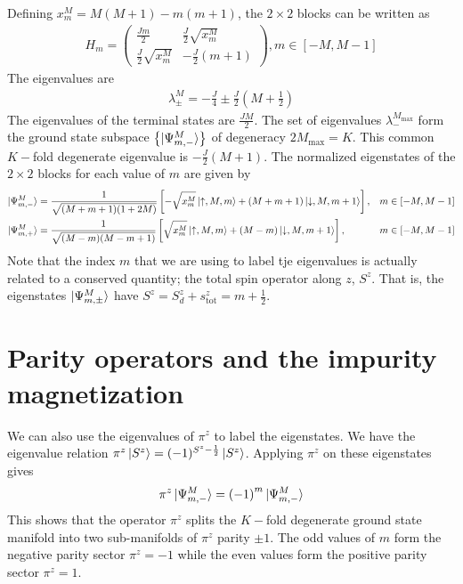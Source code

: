 \documentclass{revtex4-2}
\begin{document}
Defining \(x^M_m = M(M+1) - m(m+1)\), the \(2\times 2\) blocks can be written as
\begin{align}
	H_m = \begin{pmatrix} \frac{Jm}{2} & \frac{J}{2}\sqrt{x^M_m} \\ \frac{J}{2}\sqrt{x^M_m} & -\frac{J}{2}(m+1) \end{pmatrix} , m \in \left[-M, M-1\right] 
\end{align}
The eigenvalues are 
\begin{align}
	\lambda_{\pm}^{M} = - \frac{J}{4} \pm \frac{J}{2}\left(M + \frac{1}{2}\right) 
\end{align}
The eigenvalues of the terminal states are \(\frac{JM}{2}\). The set of eigenvalues \(\lambda^{M_\text{max}}_-\) form the ground state subspace \(\left\{ \ket{\Psi^M_{m,-}} \right\} \) of degeneracy \(2M_\text{max} = K\). This common \(K-\)fold degenerate eigenvalue is \(-\frac{J}{2}(M+1)\).
The normalized eigenstates of the \(2\times 2\) blocks for each value of \(m\) are given by
\begin{align}
	\ket{\Psi^M_{m,-}} &= \frac{1}{\sqrt{(M+m+1)(1+2M)}}\left[-\sqrt{x_m^M}\ket{\uparrow, M, m} + \left(M + m + 1\right)\ket{\downarrow,M,m+1}\right],& m \in \left[-M, M-1\right] \\
	\ket{\Psi^M_{m,+}} &= \frac{1}{\sqrt{(M -m)(M - m + 1)}}\left[\sqrt{x_m^M}\ket{\uparrow, M, m} + \left(M - m\right)\ket{\downarrow,M,m+1}\right],& m \in \left[-M, M-1\right]
\end{align}
Note that the index \(m\) that we are using to label tje eigenvalues is actually related to a conserved quantity; the total spin operator along \(z\), \(S^z\). That is, the eigenstates \(\ket{\Psi^M_{m,\pm}}\) have \(S^z = S_d^z + s_\text{tot}^z = m + \frac{1}{2}\).

\section{Parity operators and the impurity magnetization}
We can also use the eigenvalues of \(\pi^z\) to label the eigenstates. We have the eigenvalue relation \(\pi^z \ket{S^z} = (-1)^{S^z - \frac{1}{2}}\ket{S^z}\). Applying \(\pi^z\) on these eigenstates gives
\begin{align}
	\pi^z\ket{\Psi^M_{m,-}} = \left( -1 \right) ^{m}\ket{\Psi^M_{m,-}}
\end{align}
This shows that the operator \(\pi^z\) splits the \(K-\)fold degenerate ground state manifold into two sub-manifolds of \(\pi^z\) parity \(\pm 1\). The odd values of \(m\) form the negative parity sector \(\pi^z = -1\) while the even values form the positive parity sector \(\pi^z = 1\).
\end{document}
